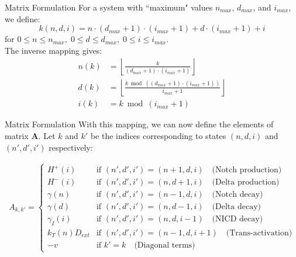 \documentclass[aspectratio=169]{beamer}
\begin{document}
\begin{frame}{Matrix Formulation}
For a system with ``maximum" values $n_{max}$, $d_{max}$, and $i_{max}$, we define:
\[
k(n,d,i) = n \cdot (d_{max}+1) \cdot (i_{max}+1) + d \cdot (i_{max}+1) + i
\]
for $0 \leq n \leq n_{max}, \; 0 \leq d \leq d_{max}, \; 0 \leq i \leq i_{max}$. \\
The inverse mapping gives:
\begin{align*}
n(k) &= \left\lfloor \frac{k}{(d_{max}+1) \cdot (i_{max}+1)} \right\rfloor \\
d(k) &= \left\lfloor \frac{k \bmod ((d_{max}+1) \cdot (i_{max}+1))}{i_{max}+1} \right\rfloor \\
i(k) &= k \bmod (i_{max}+1)
\end{align*}
\end{frame}

\begin{frame}{Matrix Formulation}
With this mapping, we can now define the elements of matrix $\mathbf{A}$. Let $k$ and $k'$ be the indices corresponding to states $(n,d,i)$ and $(n',d',i')$ respectively:

\begin{align*}
A_{k,k'} = 
\begin{cases}
H^+(i) & \text{if } (n',d',i') = (n+1,d,i) \quad \text{(Notch production)} \\
H^-(i) & \text{if } (n',d',i') = (n,d+1,i) \quad \text{(Delta production)} \\
\gamma(n) & \text{if } (n',d',i') = (n-1,d,i) \quad \text{(Notch decay)} \\
\gamma(d) & \text{if } (n',d',i') = (n,d-1,i) \quad \text{(Delta decay)} \\
\gamma_I(i) & \text{if } (n',d',i') = (n,d,i-1) \quad \text{(NICD decay)} \\
k_T(n)D_{ext} & \text{if } (n',d',i') = (n-1,d,i+1) \quad \text{(Trans-activation)} \\
-v & \text{if } k' = k \quad \text{(Diagonal terms)}
\end{cases}
\end{align*}
\end{frame}
\end{document}
